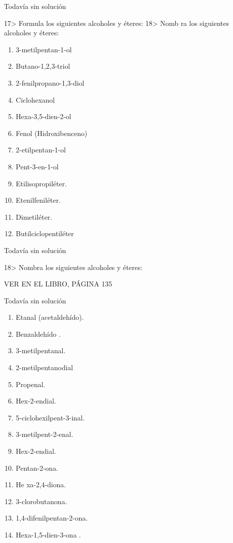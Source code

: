 \documentclass{article}
\begin{document}
\begin{solution}[print=false]
  Todavía sin solución
\end{solution}

\begin{exercise}
  17> Formula los siguientes alcoholes y éteres: 18> Nomb ra los siguientes alcoholes y éteres:
  \begin{enumerate}
    \item 3-metilpentan-1-ol
    \item Butano-1,2,3-triol
    \item 2-fenilpropano-1,3-diol
    \item Ciclohexanol
    \item Hexa-3,5-dien-2-ol
    \item Fenol (Hidroxibenceno)
    \item 2-etilpentan-1-ol
    \item Pent-3-en-1-ol
    \item Etilisopropiléter.
    \item Etenilfeniléter.
    \item Dimetiléter.
    \item Butilciclopentiléter
  \end{enumerate}
\end{exercise}

\begin{solution}[print=false]
  Todavía sin solución
\end{solution}

\begin{exercise}
  18> Nombra los siguientes alcoholes y éteres:

  VER EN EL LIBRO, PÁGINA 135
\end{exercise}

\begin{solution}[print=false]
  Todavía sin solución
\end{solution}


\begin{exercise}
  \begin{enumerate}
    \item Etanal (acetaldehído).
    \item Benzaldehído .
    \item 3-metilpentanal.
    \item 2-metilpentanodial
    \item Propenal.
    \item Hex-2-endial.
    \item 5-ciclohexilpent-3-inal.
    \item 3-metilpent-2-enal.
    \item Hex-2-endial.
    \item Pentan-2-ona.
    \item He xa-2,4-diona.
    \item 3-clorobutanona.
    \item 1,4-difenilpentan-2-ona.
    \item Hexa-1,5-dien-3-ona .
  \end{enumerate}
\end{exercise}
\end{document}
